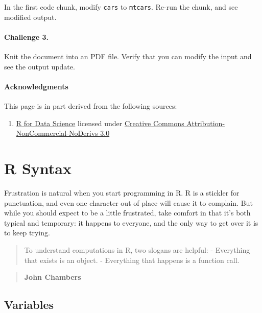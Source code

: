 \documentclass[]{book}
\providecommand{\tightlist}{%
  \setlength{\itemsep}{0pt}\setlength{\parskip}{0pt}}
\begin{document}
In the first code chunk, modify \texttt{cars} to \texttt{mtcars}. Re-run
the chunk, and see modified output.

\subsubsection*{Challenge 3.}\label{challenge-3.}

Knit the document into an PDF file. Verify that you can modify the input
and see the output update.

\subsubsection*{Acknowledgments}\label{acknowledgments-2}

This page is in part derived from the following sources:

\begin{enumerate}
\def\labelenumi{\arabic{enumi}.}
\tightlist
\item
  \href{https://r4ds.had.co.nz}{R for Data Science} licensed under
  \href{https://creativecommons.org/licenses/by-nc-nd/3.0/us/}{Creative
  Commons Attribution-NonCommercial-NoDerivs 3.0}
\end{enumerate}

\chapter{R Syntax}\label{r-syntax}

Frustration is natural when you start programming in R. R is a stickler
for punctuation, and even one character out of place will cause it to
complain. But while you should expect to be a little frustrated, take
comfort in that it's both typical and temporary: it happens to everyone,
and the only way to get over it is to keep trying.

\begin{quote}
To understand computations in R, two slogans are helpful: - Everything
that exists is an object. - Everything that happens is a function call.
\end{quote}

\begin{quote}
\textbf{John Chambers}
\end{quote}

\section{Variables}\label{variables}
\end{document}
